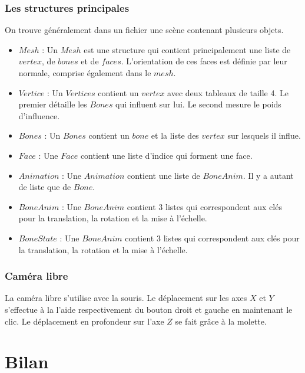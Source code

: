 \documentclass[a4paper]{report}
\begin{document}
\subsection{Les structures principales}
\par
On trouve généralement dans un fichier une scène contenant plusieurs objets.

\begin{itemize}
\item $Mesh$ : Un $Mesh$ est une structure qui contient principalement une liste de $vertex$, de $bones$ et de $faces$. L'orientation de ces faces est définie par leur normale, comprise également dans le $mesh$.
\item $Vertice$ : Un $Vertices$ contient un $vertex$ avec deux tableaux de taille 4. Le premier détaille les $Bones$ qui influent sur lui. Le second mesure le poids d'influence.
\item $Bones$ : Un $Bones$ contient un $bone$ et la liste des $vertex$ sur lesquels il influe.
\item $Face$ : Une $Face$ contient une liste d'indice qui forment une face.
\item $Animation$ : Une $Animation$ contient une liste de $BoneAnim$. Il y a autant de liste que de $Bone$.
\item $BoneAnim$ : Une $BoneAnim$ contient 3 listes qui correspondent aux clés pour la translation, la rotation et la mise à l'échelle.
\item $BoneState$ : Une $BoneAnim$ contient 3 listes qui correspondent aux clés pour la translation, la rotation et la mise à l'échelle.
\end{itemize}

\subsection{Caméra libre}
\par
La caméra libre s'utilise avec la souris. Le déplacement sur les axes $X$ et $Y$ s'effectue à la l'aide respectivement du bouton droit et gauche en maintenant le clic. Le déplacement en profondeur sur l'axe $Z$ se fait grâce à la molette.

\newpage
\chapter{Bilan}
\end{document}
